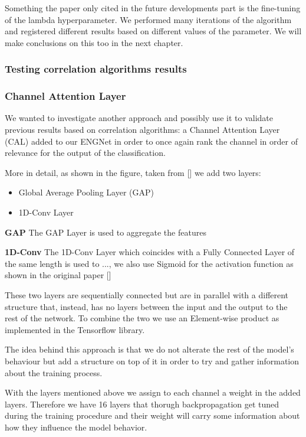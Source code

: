 \documentclass{Configuration_Files/PoliMi3i_thesis}
\begin{document}
Something the paper only cited in the future developments part is the fine-tuning of the lambda hyperparameter.
We performed many iterations of the algorithm and registered different results based on different values of the parameter.
We will make conclusions on this too in the next chapter.


\subsubsection{Testing correlation algorithms results}

\subsubsection{Channel Attention Layer}

We wanted to investigate another approach and possibly use it to validate previous results based on correlation algorithms: a Channel Attention Layer (CAL) added to our ENGNet in order to once again rank the channel in order of relevance for the output of the classification.

More in detail, as shown in the figure, taken from [] we add two layers:

\begin{itemize}
	\item Global Average Pooling Layer (GAP)
	\item 1D-Conv Layer
\end{itemize}

\textbf{GAP} \quad The GAP Layer is used to aggregate the features

\textbf{1D-Conv} \quad The 1D-Conv Layer which coincides with a Fully Connected Layer of the same length is used to ..., we also use Sigmoid for the activation function as shown in the original paper []

These two layers are sequentially connected but are in parallel with a different structure that, instead, has no layers between the input and the output to the rest of the network.
To combine the two we use an Element-wise product as implemented in the Tensorflow library.

The idea behind this approach is that we do not alterate the rest of the model's behaviour but add a structure on top of it in order to try and gather information about the training process.

With the layers mentioned above we assign to each channel a weight in the added layers.
Therefore we have 16 layers that thorugh backpropagation get tuned during the training procedure and their weight will carry some information about how they influence the model behavior.
\end{document}
